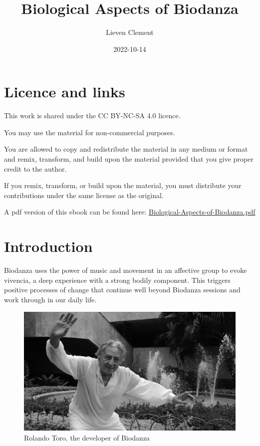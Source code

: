 \documentclass[
  11pt,
]{book}
\title{Biological Aspects of Biodanza}
\author{Lieven Clement}
\date{2022-10-14}
\begin{document}
\maketitle

{
\hypersetup{linkcolor=}
\setcounter{tocdepth}{2}
\tableofcontents
}
\hypertarget{licence-and-links}{%
\chapter*{Licence and links}\label{licence-and-links}}

This work is shared under the
CC BY-NC-SA 4.0 licence.

You may use the material for non-commercial purposes.

You are allowed to copy and redistribute the material in any medium or format and remix, transform, and build upon the material provided that you give proper credit to the author.

If you remix, transform, or build upon the material, you must distribute your contributions under the same license as the original.

A pdf version of this ebook can be found here: \href{https://biodanzabrugge.be/biologicalAspectsBiodanza/Biological-Aspects-of-Biodanza.pdf}{Biological-Aspects-of-Biodanza.pdf}

\hypertarget{intro}{%
\chapter{Introduction}\label{intro}}

Biodanza uses the power of music and movement in an affective group to evoke vivencia, a deep experience with a strong bodily component. This triggers positive processes of change that continue well beyond Biodanza sessions and work through in our daily life.

\begin{figure}

{\centering \includegraphics[width=0.45\linewidth]{./figs/rolando} 

}

\caption{Rolando Toro, the developer of Biodanza}\label{fig:rolandoToro}
\end{figure}
\end{document}
